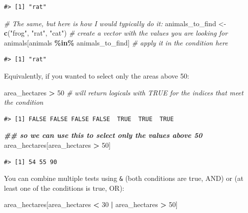 \documentclass[
]{book}
\newenvironment{Shaded}{\begin{snugshade}}{\end{snugshade}}
\newcommand{\CommentTok}[1]{\textcolor[rgb]{0.56,0.35,0.01}{\textit{#1}}}
\newcommand{\DecValTok}[1]{\textcolor[rgb]{0.00,0.00,0.81}{#1}}
\newcommand{\DocumentationTok}[1]{\textcolor[rgb]{0.56,0.35,0.01}{\textbf{\textit{#1}}}}
\newcommand{\FunctionTok}[1]{\textcolor[rgb]{0.13,0.29,0.53}{\textbf{#1}}}
\newcommand{\NormalTok}[1]{#1}
\newcommand{\OtherTok}[1]{\textcolor[rgb]{0.56,0.35,0.01}{#1}}
\newcommand{\SpecialCharTok}[1]{\textcolor[rgb]{0.81,0.36,0.00}{\textbf{#1}}}
\newcommand{\StringTok}[1]{\textcolor[rgb]{0.31,0.60,0.02}{#1}}
\begin{document}
\begin{verbatim}
#> [1] "rat"
\end{verbatim}

\begin{Shaded}
\begin{Highlighting}[]
\CommentTok{\# The same, but here is how I would typically do it:}
\NormalTok{animals\_to\_find }\OtherTok{\textless{}{-}} \FunctionTok{c}\NormalTok{(}\StringTok{"frog"}\NormalTok{, }\StringTok{"rat"}\NormalTok{, }\StringTok{"cat"}\NormalTok{) }\CommentTok{\# create a vector with the values you are looking for}
\NormalTok{animals[animals }\SpecialCharTok{\%in\%}\NormalTok{ animals\_to\_find] }\CommentTok{\# apply it in the condition here}
\end{Highlighting}
\end{Shaded}

\begin{verbatim}
#> [1] "rat"
\end{verbatim}

Equivalently, if you wanted to select only the areas above 50:

\begin{Shaded}
\begin{Highlighting}[]
\NormalTok{area\_hectares }\SpecialCharTok{\textgreater{}} \DecValTok{50}    \CommentTok{\# will return logicals with TRUE for the indices that meet the condition}
\end{Highlighting}
\end{Shaded}

\begin{verbatim}
#> [1] FALSE FALSE FALSE FALSE  TRUE  TRUE  TRUE
\end{verbatim}

\begin{Shaded}
\begin{Highlighting}[]
\DocumentationTok{\#\# so we can use this to select only the values above 50}
\NormalTok{area\_hectares[area\_hectares }\SpecialCharTok{\textgreater{}} \DecValTok{50}\NormalTok{]}
\end{Highlighting}
\end{Shaded}

\begin{verbatim}
#> [1] 54 55 90
\end{verbatim}

You can combine multiple tests using \texttt{\&} (both conditions are true, AND) or \texttt{\textbar{}}
(at least one of the conditions is true, OR):

\begin{Shaded}
\begin{Highlighting}[]
\NormalTok{area\_hectares[area\_hectares }\SpecialCharTok{\textless{}} \DecValTok{30} \SpecialCharTok{|}\NormalTok{ area\_hectares }\SpecialCharTok{\textgreater{}} \DecValTok{50}\NormalTok{]}
\end{Highlighting}
\end{Shaded}
\end{document}
